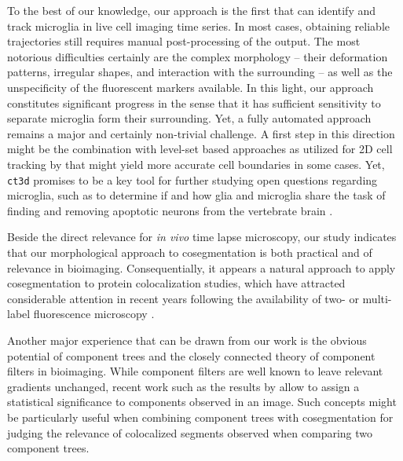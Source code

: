 To the best of our knowledge, our approach is the first that can
identify and track microglia in live cell imaging time series. In most
cases, obtaining reliable trajectories still requires manual
post-processing of the output. The most notorious difficulties
certainly are the complex morphology -- their deformation patterns,
irregular shapes, and interaction with the surrounding -- as well as
the unspecificity of the fluorescent markers available. In this light,
our approach constitutes significant progress in the sense that it has
sufficient sensitivity to separate microglia form their
surrounding. Yet, a fully automated approach remains a major and
certainly non-trivial challenge. A first step in this direction might
be the combination with level-set based approaches as utilized for 2D
cell tracking by \cite{Nath:06} that might yield more accurate cell
boundaries in some cases. Yet, \texttt{ct3d} promises to be a key tool
for further studying open questions regarding microglia, such as to
determine if and how glia and microglia share the task of finding and
removing apoptotic neurons from the vertebrate brain \cite{Peri:08}. 

Beside the direct relevance for \textit{in vivo} time lapse
microscopy, our study indicates that our morphological approach to
cosegmentation is both practical and of relevance in
bioimaging. Consequentially, it appears a natural approach to apply
cosegmentation to protein colocalization studies, which have attracted
considerable attention in recent years following the availability of
two- or multi-label fluorescence microscopy \cite{Zinchuk:08}.

Another major experience that can be drawn from our work is the obvious
potential of component trees and the closely connected theory of
component filters in bioimaging. While component filters are well
known to leave relevant gradients unchanged, recent work such as the
results by \cite{Coupier:05} allow to assign a
statistical significance to components observed in an image. Such
concepts might be particularly useful when combining component trees
with cosegmentation for judging the relevance of colocalized segments
observed when comparing two component trees.



